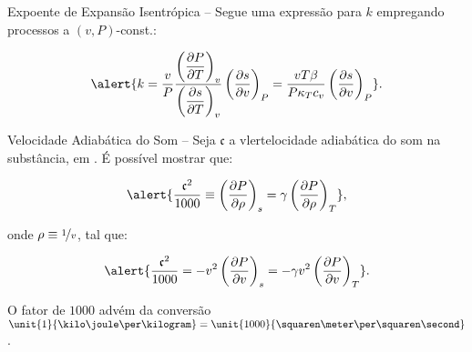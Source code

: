 \begin{frame}[allowframebreaks]{Expoente de Expansão Isentrópica --}
        \pagebreak
        Segue uma expressão para \alert{$k$} empregando processos a \alert{$(v, P)$-const.}:

        \begin{equation*}
            \alert{
                k =
                    \frac{v}{P}
                    \frac{
                        \left(\dfrac{\partial P}{\partial T}\right)_{v}
                    }{
                        \left(\dfrac{\partial s}{\partial T}\right)_{v}
                    }
                    \left(\frac{\partial s}{\partial v}\right)_{P} =
                    \frac{vT\beta}{P\kappa_Tc_v}
                    \left(\frac{\partial s}{\partial v}\right)_{P}
            }.
        \end{equation*}

    \end{frame}

    \begin{frame}[allowframebreaks]{Velocidade Adiabática do Som --}\vspace*{-0em}
        Seja \alert{$\mathfrak{c}$} a vlert{elocidade adiabática do som} na substância, em
        \alert{\meter\per\second}. É possível mostrar que:

        \begin{equation*}
            \alert{
                \frac{\mathfrak{c}^2}{1000} \equiv
                \left(\frac{\partial P}{\partial\rho}\right)_s =
                \gamma\left(\frac{\partial P}{\partial\rho}\right)_T
            },
        \end{equation*}\vspace*\medskipamount

        \noindent onde \alert{$\rho \equiv \nicefrac{1}{v}$}, tal que:

        \begin{equation*}
            \alert{
                \frac{\mathfrak{c}^2}{1000} =
                -v^2 \left(\frac{\partial P}{\partial v}\right)_s =
                -\gamma v^2 \left(\frac{\partial P}{\partial v}\right)_T
            }.
        \end{equation*}\vspace*\medskipamount

        O fator de \alert{$1000$} advém da conversão \alert{$\unit{1}{\kilo\joule\per\kilogram}
        = \unit{1000}{\squaren\meter\per\squaren\second}$}.

    \end{frame}

